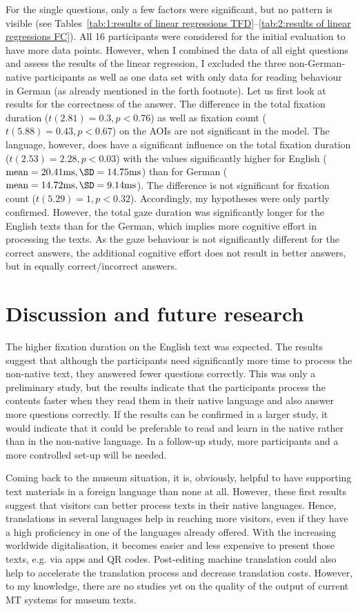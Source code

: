 \documentclass[output=paper]{langscibook}
\begin{document}
For the single questions, only a few factors were significant, but no pattern is visible (see Tables~\ref{tab:1:results of linear regressions TFD}--\ref{tab:2:results of linear regressions FC}). All 16 participants were considered for the initial evaluation to have more data points. However, when I combined the data of all eight questions and assess the results of the linear regression, I excluded the three non-German-native participants as well as one data set with only data for reading behaviour in German (as already mentioned in the forth footnote). Let us first look at results for the correctness of the answer. The difference in the total fixation duration ($t(2.81)=0.3, p<0.76$) as well as fixation count ($t(5.88)=0.43, p<0.67$) on the AOIs are not significant in the model. The language, however, does have a significant influence on the total fixation duration ($t(2.53)=2.28, p<0.03$) with the values significantly higher for English ($\text{mean}=20.41\text{ms}, \SD=14.75\text{ms}$) than for German ($\text{mean}=14.72\text{ms}, \SD=9.14\text{ms}$). The difference is not significant for fixation count ($t(5.29)=1, p<0.32$). Accordingly, my hypotheses were only partly confirmed. However, the total gaze duration was significantly longer for the English texts than for the German, which implies more cognitive effort in processing the texts. As the gaze behaviour is not significantly different for the correct answers, the additional cognitive effort does not result in better answers, but in equally correct/incorrect answers.

 \section{Discussion and future research}
 
The higher fixation duration on the English text was expected. The results suggest that although the participants need significantly more time to process the non-native text, they answered fewer questions correctly. This was only a preliminary study, but the results indicate that the participants process the contents faster when they read them in their native language and also answer more questions correctly. If the results can be confirmed in a larger study, it would indicate that it could be preferable to read and learn in the native rather than in the non-native language. In a follow-up study, more participants and a more controlled set-up will be needed.

Coming back to the museum situation, it is, obviously, helpful to have supporting text materials in a foreign language than none at all. However, these first results suggest that visitors can better process texts in their native languages. Hence, translations in several languages help in reaching more visitors, even if they have a high proficiency in one of the languages already offered. With the increasing worldwide digitalisation, it becomes easier and less expensive to present those texts, e.g. via apps and QR codes. Post-editing machine translation could also help to accelerate the translation process and decrease translation costs. However, to my knowledge, there are no studies yet on the quality of the output of current MT systems for museum texts.
\end{document}
